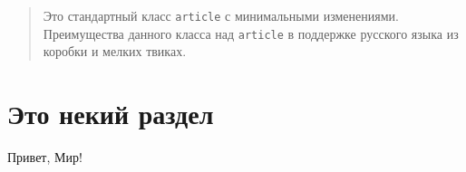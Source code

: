 \documentclass[]{mirearticle}
\title{}
\author{}
\begin{document}
\maketitle

\begin{abstract}
Это стандартный класс \texttt{article} с минимальными изменениями. Преимущества данного класса над \texttt{article} в поддержке русского языка из коробки и мелких твиках.
\end{abstract}

\section{Это некий раздел}
Привет, Мир!
\end{document}
